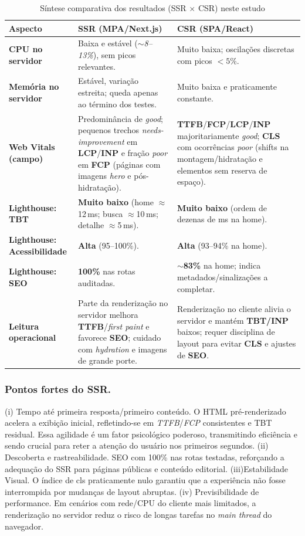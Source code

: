 \begin{table}[H]
\centering
\caption{Síntese comparativa dos resultados (SSR $\times$ CSR) neste estudo}
\label{tab:comparativo-ssr-csr}
\begin{tabular}{|p{4.2cm}|p{5.2cm}|p{5.2cm}|}
\hline
\textbf{Aspecto} & \textbf{SSR (MPA/Next.js)} & \textbf{CSR (SPA/React)} \\
\hline
\textbf{CPU no servidor} & Baixa e estável (\textit{$\sim$8--13\%}), sem picos relevantes. & Muito baixa; oscilações discretas com picos $<5\%$. \\
\hline
\textbf{Memória no servidor} & Estável, variação estreita; queda apenas ao término dos testes. & Muito baixa e praticamente constante. \\
\hline
\textbf{Web Vitals (campo)} & Predominância de \textit{good}; pequenos trechos \textit{needs-improvement} em \textbf{LCP}/\textbf{INP} e fração \textit{poor} em \textbf{FCP} (páginas com imagens \emph{hero} e pós-hidratação). & \textbf{TTFB}/\textbf{FCP}/\textbf{LCP}/\textbf{INP} majoritariamente \textit{good}; \textbf{CLS} com ocorrências \textit{poor} (shifts na montagem/hidratação e elementos sem reserva de espaço). \\
\hline
\textbf{Lighthouse: TBT} & \textbf{Muito baixo} (home $\approx$12\,ms; busca $\approx$10\,ms; detalhe $\approx$5\,ms). & \textbf{Muito baixo} (ordem de dezenas de ms na home). \\
\hline
\textbf{Lighthouse: Acessibilidade} & \textbf{Alta} (95--100\%). & \textbf{Alta} (93--94\% na home). \\
\hline
\textbf{Lighthouse: SEO} & \textbf{100\%} nas rotas auditadas. & \textbf{$\sim$83\%} na home; indica metadados/sinalizações a completar. \\
\hline
\textbf{Leitura operacional} & Parte da renderização no servidor melhora \textbf{TTFB}/\emph{first paint} e favorece \textbf{SEO}; cuidado com \emph{hydration} e imagens de grande porte. & Renderização no cliente alivia o servidor e mantém \textbf{TBT/INP} baixos; requer disciplina de layout para evitar \textbf{CLS} e ajustes de \textbf{SEO}. \\
\hline
\end{tabular}
\end{table}

\subsubsection{Pontos fortes do SSR.}
(i) Tempo até primeira resposta/primeiro conteúdo. O HTML pré-renderizado acelera a exibição inicial, refletindo-se em \textit{TTFB}/\textit{FCP} consistentes e TBT residual. Essa agilidade é um fator psicológico poderoso, transmitindo eficiência e sendo crucial para reter a atenção do usuário nos primeiros segundos.
(ii) Descoberta e rastreabilidade. SEO com 100\% nas rotas testadas, reforçando a adequação do SSR para páginas públicas e conteúdo editorial.
(iii)Estabilidade Visual. O índice de \acrshort{cls} praticamente nulo garantiu que a experiência não fosse interrompida por mudanças de layout abruptas.
(iv) Previsibilidade de performance. Em cenários com rede/CPU do cliente mais limitados, a renderização no servidor reduz o risco de longas tarefas no \emph{main thread} do navegador.

